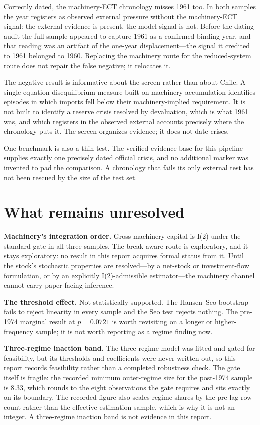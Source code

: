 \documentclass[11pt]{article}
\begin{document}
Correctly dated, the machinery-ECT chronology misses 1961 too. In both samples the year registers as observed external pressure without the machinery-ECT signal: the external evidence is present, the model signal is not. Before the dating audit the full sample appeared to capture 1961 as a confirmed binding year, and that reading was an artifact of the one-year displacement---the signal it credited to 1961 belonged to 1960. Replacing the machinery route for the reduced-system route does not repair the false negative; it relocates it.

The negative result is informative about the screen rather than about Chile. A single-equation disequilibrium measure built on machinery accumulation identifies episodes in which imports fell below their machinery-implied requirement. It is not built to identify a reserve crisis resolved by devaluation, which is what 1961 was, and which registers in the observed external accounts precisely where the chronology puts it. The screen organizes evidence; it does not date crises.

One benchmark is also a thin test. The verified evidence base for this pipeline supplies exactly one precisely dated official crisis, and no additional marker was invented to pad the comparison. A chronology that fails its only external test has not been rescued by the size of the test set.

\FloatBarrier
\section{What remains unresolved}

\textbf{Machinery's integration order.} Gross machinery capital is I(2) under the standard gate in all three samples. The break-aware route is exploratory, and it stays exploratory: no result in this report acquires formal status from it. Until the stock's stochastic properties are resolved---by a net-stock or investment-flow formulation, or by an explicitly I(2)-admissible estimator---the machinery channel cannot carry paper-facing inference.

\textbf{The threshold effect.} Not statistically supported. The Hansen--Seo bootstrap fails to reject linearity in every sample and the Seo test rejects nothing. The pre-1974 marginal result at $p=0.0721$ is worth revisiting on a longer or higher-frequency sample; it is not worth reporting as a regime finding now.

\textbf{Three-regime inaction band.} The three-regime model was fitted and gated for feasibility, but its thresholds and coefficients were never written out, so this report records feasibility rather than a completed robustness check. The gate itself is fragile: the recorded minimum outer-regime size for the post-1974 sample is 8.33, which rounds to the eight observations the gate requires and sits exactly on its boundary. The recorded figure also scales regime shares by the pre-lag row count rather than the effective estimation sample, which is why it is not an integer. A three-regime inaction band is not evidence in this report.
\end{document}
